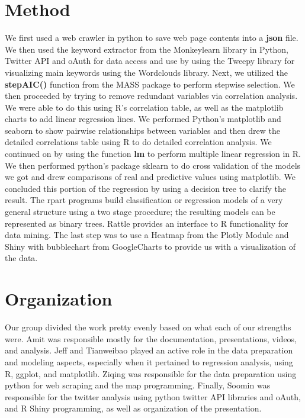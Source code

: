 \documentclass{article}
\begin{document}
{\section{Method}


We first used a web crawler in python to save web page contents into a \textbf{json} file. We then used the keyword extractor from the Monkeylearn library in Python, Twitter API and oAuth for data access and use by using the Tweepy library for visualizing main keywords using the Wordclouds library. Next, we utilized the \textbf{stepAIC()} function from the MASS package to perform stepwise selection. We then proceeded by trying to remove redundant variables via correlation analysis. We were able to do this using R's correlation table, as well as the matplotlib charts to add linear regression lines. We performed Python's matplotlib and seaborn to show pairwise relationships between variables and then drew the detailed correlations table using R to do detailed correlation analysis. We continued on by using the function \textbf{lm} to perform multiple linear regression in R. We then performed python's package sklearn to do cross validation of the models we got and drew comparisons of real and predictive values using matplotlib. We concluded this portion of the regression by using a decision tree to clarify the result. The rpart programs build classification or regression models of a very general structure using a two stage procedure; the resulting models can be represented as binary trees. Rattle provides an interface to R functionality for data mining. The last step was to use a Heatmap from the Plotly Module and Shiny with bubblechart from GoogleCharts to provide us with a visualization of the data.


\section{Organization}


Our group divided the work pretty evenly based on what each of our strengths were. Amit was responsible mostly for the documentation, presentations, videos, and analysis. Jeff and Tianweibao played an active role in the data preparation and modeling aspects, especially when it pertained to regression analysis, using R, ggplot, and matplotlib. Ziqing was responsible for the data preparation using python for web scraping and the map programming. Finally, Soomin was responsible for the twitter analysis using python twitter API libraries and oAuth, and R Shiny programming, as well as organization of the presentation.


}
\end{document}
